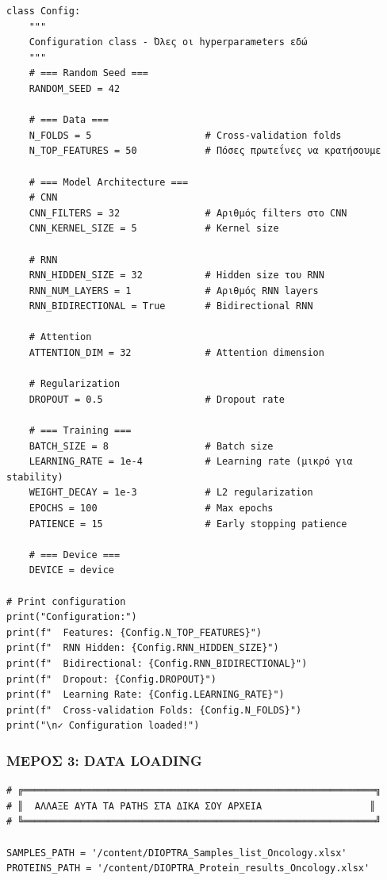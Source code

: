 \begin{lstlisting}
class Config:
    """
    Configuration class - Όλες οι hyperparameters εδώ
    """
    # === Random Seed ===
    RANDOM_SEED = 42
 
    # === Data ===
    N_FOLDS = 5                    # Cross-validation folds
    N_TOP_FEATURES = 50            # Πόσες πρωτεΐνες να κρατήσουμε
 
    # === Model Architecture ===
    # CNN
    CNN_FILTERS = 32               # Αριθμός filters στο CNN
    CNN_KERNEL_SIZE = 5            # Kernel size
 
    # RNN
    RNN_HIDDEN_SIZE = 32           # Hidden size του RNN
    RNN_NUM_LAYERS = 1             # Αριθμός RNN layers
    RNN_BIDIRECTIONAL = True       # Bidirectional RNN
 
    # Attention
    ATTENTION_DIM = 32             # Attention dimension
 
    # Regularization
    DROPOUT = 0.5                  # Dropout rate
 
    # === Training ===
    BATCH_SIZE = 8                 # Batch size
    LEARNING_RATE = 1e-4           # Learning rate (μικρό για stability)
    WEIGHT_DECAY = 1e-3            # L2 regularization
    EPOCHS = 100                   # Max epochs
    PATIENCE = 15                  # Early stopping patience
 
    # === Device ===
    DEVICE = device
 
# Print configuration
print("Configuration:")
print(f"  Features: {Config.N_TOP_FEATURES}")
print(f"  RNN Hidden: {Config.RNN_HIDDEN_SIZE}")
print(f"  Bidirectional: {Config.RNN_BIDIRECTIONAL}")
print(f"  Dropout: {Config.DROPOUT}")
print(f"  Learning Rate: {Config.LEARNING_RATE}")
print(f"  Cross-validation Folds: {Config.N_FOLDS}")
print("\n✓ Configuration loaded!")
\end{lstlisting}
 
\subsubsection*{ΜΕΡΟΣ 3: DATA LOADING}
 
\begin{lstlisting}
# ╔══════════════════════════════════════════════════════════════╗
# ║  ΑΛΛΑΞΕ ΑΥΤΑ ΤΑ PATHS ΣΤΑ ΔΙΚΑ ΣΟΥ ΑΡΧΕΙΑ                   ║
# ╚══════════════════════════════════════════════════════════════╝
 
SAMPLES_PATH = '/content/DIOPTRA_Samples_list_Oncology.xlsx'
PROTEINS_PATH = '/content/DIOPTRA_Protein_results_Oncology.xlsx'
\end{lstlisting}
 

